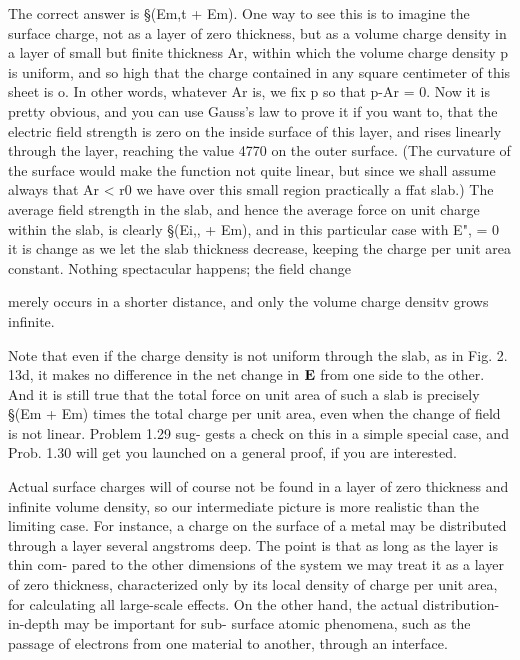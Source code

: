 The correct answer is §(Em,t + Em). One way to see this is to
imagine the surface charge, not as a layer of zero thickness, but as a
volume charge density in a layer of small but finite thickness Ar,
within which the volume charge density p is uniform, and so high that
the charge contained in any square centimeter of this sheet is o. In
other words, whatever Ar is, we fix p so that p-Ar = 0. Now it is
pretty obvious, and you can use Gauss's law to prove it if you want to,
that the electric field strength is zero on the inside surface of this
layer, and rises linearly through the layer, reaching the value 4770 on
the outer surface. (The curvature of the surface would make the
function not quite linear, but since we shall assume always that
Ar < r0 we have over this small region practically a ffat slab.) The
average field strength in the slab, and hence the average force on unit
charge within the slab, is clearly §(Ei,, + Em), and in this particular
case with E", = 0 it is %
change as we let the slab thickness decrease, keeping the charge per
unit area constant. Nothing spectacular happens; the field change

merely occurs in a shorter distance, and only the volume charge
densitv grows infinite.

 

Note that even if the charge density is not uniform through the slab,
as in Fig. 2. 13d, it makes no difference in the net change in $\mathbf{E}$ from one
side to the other. And it is still true that the total force on unit area
of such a slab is precisely §(Em + Em) times the total charge per unit
area, even when the change of field is not linear. Problem 1.29 sug-
gests a check on this in a simple special case, and Prob. 1.30 will get
you launched on a general proof, if you are interested.

Actual surface charges will of course not be found in a layer of zero
thickness and infinite volume density, so our intermediate picture is
more realistic than the limiting case. For instance, a charge on the
surface of a metal may be distributed through a layer several
angstroms deep. The point is that as long as the layer is thin com-
pared to the other dimensions of the system we may treat it as a layer
of zero thickness, characterized only by its local density of charge
per unit area, for calculating all large-scale effects. On the other
hand, the actual distribution-in-depth may be important for sub-
surface atomic phenomena, such as the passage of electrons from one
material to another, through an interface.

